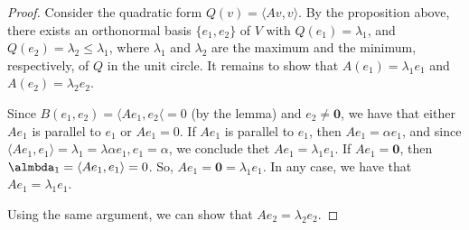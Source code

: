 \documentclass[10pt]{article}
\newcommand{\ve}[1]{\mathbf{#1}}
\begin{document}
\begin{itemize}
    \begin{proof}
      Consider the quadratic form $Q(v) = \langle Av, v \rangle$. By the proposition above, there exists an orthonormal basis $\{ e_1, e_2 \}$ of $V$ with $Q(e_1) = \lambda_1$, and $Q(e_2) = \lambda_2 \leq \lambda_1$, where $\lambda_1$ and $\lambda_2$ are the maximum and the minimum, respectively, of $Q$ in the unit circle. It remains to show that
      $A(e_1) = \lambda_1 e_1$ and $A(e_2) = \lambda_2 e_2$.

      Since $B(e_1, e_2) = \langle A e_1, e_2 \langle = 0$ (by the lemma) and $e_2 \neq \ve{0}$, we have that either $Ae_1$ is parallel to $e_1$ or $A e_1 = 0$. If $Ae_1$ is parallel to $e_1$, then $A e_1 = \alpha e_1$, and since $\langle Ae_1, e_1 \rangle = \lambda_1 = \lambda \alpha e_1, e_1 = \alpha$, we conclude thet $Ae_1 = \lambda_1 e_1$. If $Ae_1 = \ve{0}$, then $\almbda_1 = \langle Ae_1, e_1 \rangle = 0$. So, $Ae_1 = \ve{0} = \lambda_1 e_1$. In any case, we have that $Ae_1 = \lambda_1 e_1$.

      Using the same argument, we can show that $Ae_2 = \lambda_2 e_2$.
    \end{proof}
  \end{itemize}  
\end{document}
